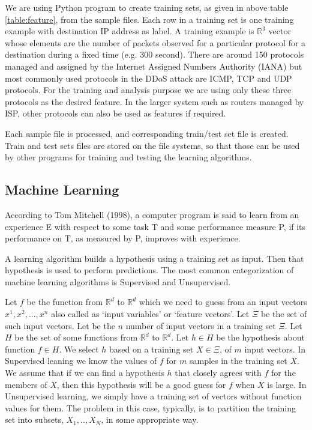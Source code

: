 \documentclass[12pt,oneside,a4paper]{article}
\begin{document}
We are using Python program to create training sets, as given in above table \ref{table:feature}, from the sample files. Each row in a training set is one training example with destination IP address as label. A training example is $\mathbb{R}^3$ vector whose elements are the number of packets observed for a particular protocol for a destination during a fixed time (e.g. 300 second). There are around 150 protocols managed and assigned by the Internet Assigned Numbers Authority (IANA) but most commonly used protocols in the DDoS attack are ICMP, TCP and UDP protocols. For the training and analysis purpose we are using only these three protocols as the desired feature. In the larger system such as routers managed by ISP, other protocols can also be used as features if required.

Each sample file is processed, and corresponding train/test set file is created. Train and test sets files are stored on the file systems, so that those can be used by other programs for training and testing the learning algorithms.

\subsection{Machine Learning}

According to Tom Mitchell (1998), a computer program is said to learn from an experience E with respect to some task T and some performance measure P, if its performance on T, as measured by P, improves with experience.

A learning algorithm builds a hypothesis using a training set as input. Then that hypothesis is used to perform predictions. The most common categorization of machine learning algorithms is Supervised and Unsupervised.

Let $f$ be the function from $\mathbb{R}^d$ to $\mathbb{R}^d$ which we need to guess from an input vectors $x^{1}, x^{2}, ..., x^{n}$ also called as `input variables' or `feature vectors'. Let $\Xi$ be the set of such input vectors. Let be the $n$ number of input vectors in a training set $\Xi$. Let $H$ be the set of some functions from $\mathbb{R}^d$ to $\mathbb{R}^d$. Let $h \in H$ be the hypothesis about function $f \in H$. We select $h$ based on a training set $X \in \Xi$, of $m$ input vectors. In Supervised leaning we know the values of $f$ for $m$ samples in the training set $X$. We assume that if we can find a hypothesis $h$ that closely agrees with $f$ for the members of $X$, then this hypothesis will be a good guess for $f$ when $X$ is large. In Unsupervised learning, we simply have a training set of vectors without function values for them. The problem in this case, typically, is to partition the training set into subsets, $X_1,.. ,X_{N}$, in some appropriate way.\cite{machine-learning}
\end{document}

